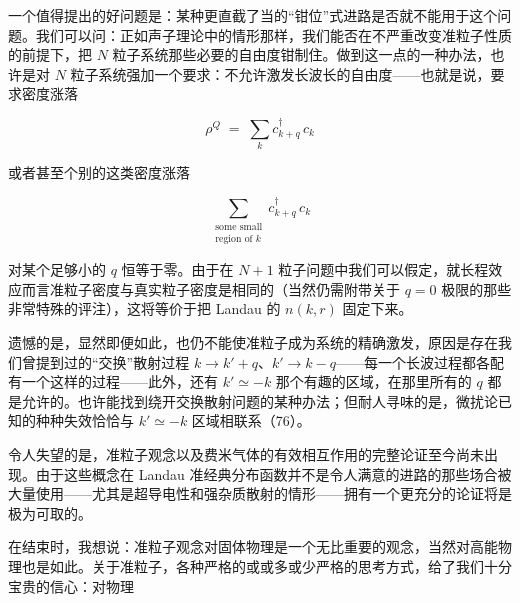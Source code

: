 一个值得提出的好问题是：某种更直截了当的“钳位”式进路是否就不能用于这个问题。我们可以问：正如声子理论中的情形那样，我们能否在不严重改变准粒子性质的前提下，把 $N$ 粒子系统那些必要的自由度钳制住。做到这一点的一种办法，也许是对 $N$ 粒子系统强加一个要求：不允许激发长波长的自由度——也就是说，要求密度涨落

\begin{equation*}
\rho^{Q} \;=\; \sum_{k} c_{k+q}^{\dagger}\, c_{k}
\end{equation*}

或者甚至个别的这类密度涨落

\begin{equation*}
\sum_{\substack{\text{some small}\\ \text{region of } k}} c_{k+q}^{\dagger}\, c_{k}
\end{equation*}

对某个足够小的 $q$ 恒等于零。由于在 $N+1$ 粒子问题中我们可以假定，就长程效应而言准粒子密度与真实粒子密度是相同的（当然仍需附带关于 $q=0$ 极限的那些非常特殊的评注），这将等价于把 Landau 的 $n(k,r)$ 固定下来。

遗憾的是，显然即便如此，也仍不能使准粒子成为系统的精确激发，原因是存在我们曾提到过的“交换”散射过程 $k \to k'+q$、$k' \to k-q$——每一个长波过程都各配有一个这样的过程——此外，还有 $k' \simeq -k$ 那个有趣的区域，在那里所有的 $q$ 都是允许的。也许能找到绕开交换散射问题的某种办法；但耐人寻味的是，微扰论已知的种种失效恰恰与 $k' \simeq -k$ 区域相联系（76）。

令人失望的是，准粒子观念以及费米气体的有效相互作用的完整论证至今尚未出现。由于这些概念在 Landau 准经典分布函数并不是令人满意的进路的那些场合被大量使用——尤其是超导电性和强杂质散射的情形——拥有一个更充分的论证将是极为可取的。

在结束时，我想说：准粒子观念对固体物理是一个无比重要的观念，当然对高能物理也是如此。关于准粒子，各种严格的或或多或少严格的思考方式，给了我们十分宝贵的信心：对物理


